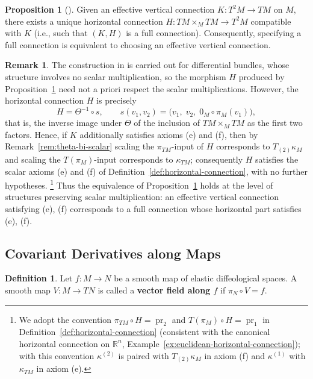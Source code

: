 \documentclass{amsart}
\newcommand{\R}{\mathbb{R}}
\DeclareMathOperator{\pr}{pr}
\theoremstyle{definition}
\newtheorem{defn}[thm]{Definition}
\newtheorem{rem}[thm]{Remark}
\newtheorem{prop}[thm]{Proposition}
\begin{document}
\begin{prop}[{\cite[Theorem~7.3]{LW}}]\label{prop:effective-iff-full}
Given an effective vertical connection $K \colon T^2M \to TM$ on $M$,
there exists a unique horizontal connection
$H \colon TM \times_M TM \to T^2M$ compatible with $K$
(i.e., such that $(K, H)$ is a full connection).
Consequently, specifying a full connection is equivalent to choosing an effective vertical connection.
\end{prop}

\begin{rem}\label{rem:H-inherits-scalar}
The construction in \cite[Theorem~7.3]{LW} is carried out for differential bundles,
whose structure involves no scalar multiplication, so the morphism $H$ produced by
Proposition~\ref{prop:effective-iff-full} need not a priori respect the scalar
multiplications. However, the horizontal connection $H$ is precisely
\[
  H = \Theta^{-1} \circ s, \qquad
  s(v_1, v_2) = \bigl(v_1,\; v_2,\; 0_M \circ \pi_M(v_1)\bigr),
\]
that is, the inverse image under $\Theta$ of the inclusion of $TM \times_M TM$ as
the first two factors. Hence, if $K$ additionally satisfies axioms (e) and (f),
then by Remark~\ref{rem:theta-bi-scalar} scaling the $\pi_{TM}$-input of $H$
corresponds to $T_{(2)}\kappa_M$ and scaling the $T(\pi_M)$-input corresponds to
$\kappa_{TM}$; consequently $H$ satisfies the scalar axioms (e) and (f) of
Definition~\ref{def:horizontal-connection}, with no further hypotheses.%
\footnote{We adopt the convention $\pi_{TM} \circ H = \pr_2$ and
$T(\pi_M) \circ H = \pr_1$ in Definition~\ref{def:horizontal-connection}
(consistent with the canonical horizontal connection on $\R^n$,
Example~\ref{ex:euclidean-horizontal-connection}); with this convention
$\kappa^{(2)}$ is paired with $T_{(2)}\kappa_M$ in axiom (f) and $\kappa^{(1)}$
with $\kappa_{TM}$ in axiom (e).}
Thus the equivalence of Proposition~\ref{prop:effective-iff-full} holds at the
level of structures preserving scalar multiplication: an effective vertical
connection satisfying (e), (f) corresponds to a full connection whose horizontal
part satisfies (e), (f).
\end{rem}

\subsection{Covariant Derivatives along Maps}\label{subsec:cov-along}

\begin{defn}\label{def:vf-along-map}
Let $f \colon M \to N$ be a smooth map of elastic diffeological spaces.
A smooth map $V \colon M \to TN$ is called a
\textbf{vector field along $f$} if $\pi_N \circ V = f$.
\end{defn}
\end{document}
